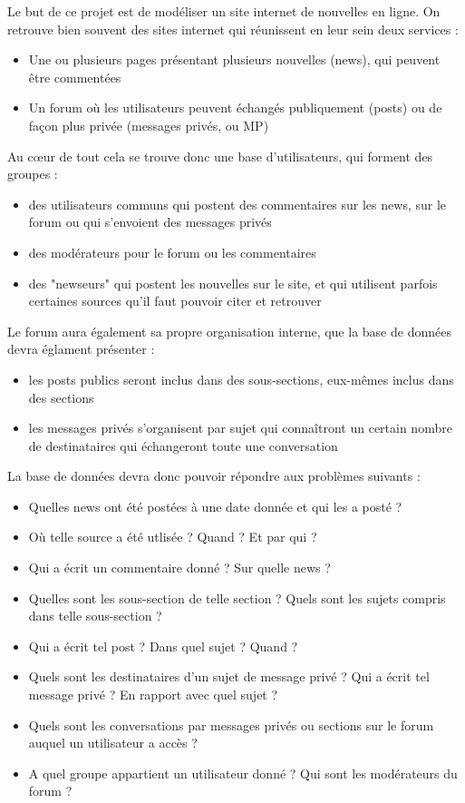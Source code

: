 Le but de ce projet est de modéliser un site internet de nouvelles en ligne. On retrouve bien souvent des sites internet qui réunissent en leur sein deux services :
\begin{itemize}
	\item Une ou plusieurs pages présentant plusieurs nouvelles (news), qui peuvent être commentées
	\item Un forum où les utilisateurs peuvent échangés publiquement (posts) ou de façon plus privée (messages privés, ou MP)
\end{itemize}

\smallskip
Au c\oe ur de tout cela se trouve donc une base d'utilisateurs, qui forment des groupes :
\begin{itemize}
	\item des utilisateurs communs qui postent des commentaires sur les news, sur le forum ou qui s'envoient des messages privés
	\item des modérateurs pour le forum ou les commentaires
	\item des "newseurs" qui postent les nouvelles sur le site, et qui utilisent parfois certaines sources qu'il faut pouvoir citer et retrouver
\end{itemize}

\smallskip
Le forum aura également sa propre organisation interne, que la base de données devra églament présenter :
\begin{itemize}
	\item les posts publics seront inclus dans des sous-sections, eux-mêmes inclus dans des sections
	\item les messages privés s'organisent par sujet qui connaîtront un certain nombre de destinataires qui échangeront toute une conversation
\end{itemize}

\bigskip
La base de données devra donc pouvoir répondre aux problèmes suivants :
\begin{itemize}
	\item Quelles news ont été postées à une date donnée et qui les a posté ?
	\item Où telle source a été utlisée ? Quand ? Et par qui ?
	\item Qui a écrit un commentaire donné ? Sur quelle news ?
	\item Quelles sont les sous-section de telle section ? Quels sont les sujets compris dans telle sous-section ?
	\item Qui a écrit tel post ? Dans quel sujet ? Quand ?
	\item Quels sont les destinataires d'un sujet de message privé ? Qui a écrit tel message privé ? En rapport avec quel sujet ?
	\item Quels sont les conversations par messages privés ou sections sur le forum auquel un utilisateur a accès ?
	\item A quel groupe appartient un utilisateur donné ? Qui sont les modérateurs du forum ? 
\end{itemize}

